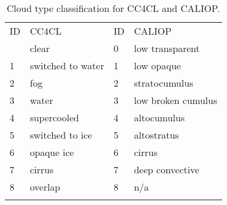 \clearpage

\begin{table}[h]
  \caption{Cloud type classification for CC4CL and CALIOP.}
  \begin{tabular}{l|l||l|l}
    \tophline
    ID & CC4CL & ID & CALIOP \\
    \middlehline
    0 & clear & 0 & low transparent \\
    1 & switched to water & 1 & low opaque \\
    2 & fog & 2 & stratocumulus \\
    3 & water & 3 & low broken cumulus \\
    4 & supercooled & 4 & altocumulus \\
    5 & switched to ice & 5 & altostratus \\
    6 & opaque ice & 6 & cirrus \\
    7 & cirrus & 7& deep convective \\
    8 & overlap & 8 & n/a \\
    \bottomhline
  \end{tabular}
  \label{tab:cloud_types}
\end{table}

\clearpage

